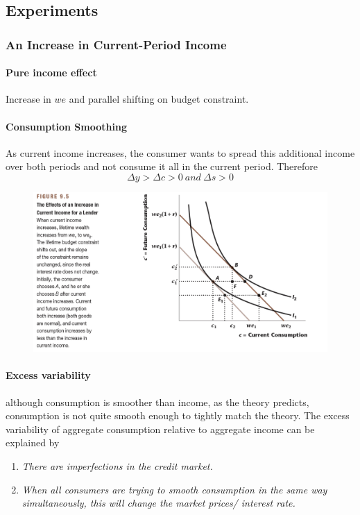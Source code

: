 \documentclass[11pt]{article}
\begin{document}
	\subsection{Experiments}
		\subsubsection{An Increase in Current-Period Income}
		\paragraph{Pure income effect} Increase in $we$ and parallel shifting on budget constraint. 
		\paragraph{Consumption Smoothing} As current income increases, the consumer wants to spread this additional income over both periods and not consume it all in the current period. Therefore
		\[
			\Delta y > \Delta c > 0\ and\ \Delta s > 0
		\]
		
		\begin{figure}[h]
			\centering
			\includegraphics[width=\linewidth]{figures/95}
		\end{figure}
		
		\paragraph{Excess variability} although consumption is smoother than income, as the theory predicts, consumption is not  quite smooth enough to tightly match the theory. The excess variability of aggregate consumption relative to aggregate income can be explained by 
		\begin{enumerate}
			\item \emph{There are imperfections in the credit market.}
			\item \emph{When all consumers are trying to smooth consumption in the same way simultaneously, this will change the market prices/ interest rate.}
		\end{enumerate}
		
\end{document}
